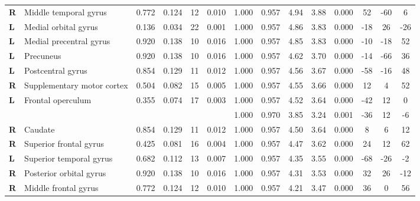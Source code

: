 \begin{landscape}
\begin{table}[!ht]
\begin{tabular}{ll|cccc|ccccc|ccc}
        \textbf{R} & Middle temporal gyrus & 0.772 & 0.124 & 12 & 0.010 & 1.000 & 0.957 & 4.94 & 3.88 & 0.000 & 52 & -60 & 6 \\
        \textbf{L} & Medial orbital gyrus & 0.136 & 0.034 & 22 & 0.001 & 1.000 & 0.957 & 4.86 & 3.83 & 0.000 & -18 & 26 & -26 \\
        \textbf{L} & Medial precentral gyrus & 0.920 & 0.138 & 10 & 0.016 & 1.000 & 0.957 & 4.85 & 3.83 & 0.000 & -10 & -18 & 52 \\
        \textbf{L} & Precuneus & 0.920 & 0.138 & 10 & 0.016 & 1.000 & 0.957 & 4.62 & 3.70 & 0.000 & -14 & -66 & 36 \\
        \textbf{L} & Postcentral gyrus & 0.854 & 0.129 & 11 & 0.012 & 1.000 & 0.957 & 4.56 & 3.67 & 0.000 & -58 & -16 & 48 \\
        \textbf{R} & Supplementary motor cortex & 0.504 & 0.082 & 15 & 0.005 & 1.000 & 0.957 & 4.55 & 3.66 & 0.000 & 12 & 4 & 52 \\
        \textbf{L} & Frontal operculum & 0.355 & 0.074 & 17 & 0.003 & 1.000 & 0.957 & 4.52 & 3.64 & 0.000 & -42 & 12 & 0 \\
        \textbf{} & & & & & & 1.000 & 0.970 & 3.85 & 3.24 & 0.001 & -36 & 12 & -6 \\
        \textbf{R} & Caudate & 0.854 & 0.129 & 11 & 0.012 & 1.000 & 0.957 & 4.50 & 3.64 & 0.000 & 8 & 6 & 12 \\
        \textbf{R} & Superior frontal gyrus & 0.425 & 0.081 & 16 & 0.004 & 1.000 & 0.957 & 4.47 & 3.62 & 0.000 & 24 & 12 & 62 \\
        \textbf{L} & Superior temporal gyrus & 0.682 & 0.112 & 13 & 0.007 & 1.000 & 0.957 & 4.35 & 3.55 & 0.000 & -68 & -26 & -2 \\
        \textbf{R} & Posterior orbital gyrus & 0.920 & 0.138 & 10 & 0.016 & 1.000 & 0.957 & 4.31 & 3.53 & 0.000 & 32 & 26 & -12 \\
        \textbf{R} & Middle frontal gyrus & 0.772 & 0.124 & 12 & 0.010 & 1.000 & 0.957 & 4.21 & 3.47 & 0.000 & 36 & 0 & 56 \\

\end{tabular}
\end{table}
\end{landscape}
